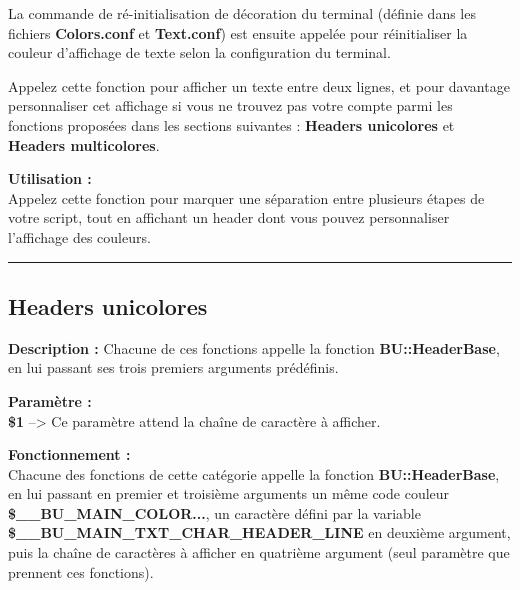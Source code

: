 \documentclass[a4paper,10pt]{article}
\begin{document}
\begin{justify}
    La commande de ré-initialisation de décoration du terminal (définie dans les fichiers \textbf{\color{lime}Colors.conf} et \textbf{\color{lime}Text.conf}) est ensuite appelée pour réinitialiser la couleur d'affichage de texte selon la configuration du terminal.
\end{justify}

\begin{justify}
    Appelez cette fonction pour afficher un texte entre deux lignes, et pour davantage personnaliser cet affichage si vous ne trouvez pas votre compte parmi les fonctions proposées dans les sections suivantes : \textbf{\color{green}Headers unicolores} et \textbf{\color{green}Headers multicolores}.
\end{justify}

\begin{justify}
    \textbf{Utilisation :}\\
    Appelez cette fonction pour marquer une séparation entre plusieurs étapes de votre script, tout en affichant un header dont vous pouvez personnaliser l'affichage des couleurs.
\end{justify}




\color{green}\par\noindent\rule{\textwidth}{0.4pt}\color{white}

\color{green}
\subsection{Headers unicolores}\color{white}

\begin{justify}
    \textbf{Description :}
    Chacune de ces fonctions appelle la fonction \textbf{\color{mauve}BU::HeaderBase}, en lui passant ses trois premiers arguments prédéfinis.
\end{justify}

\begin{justify}
    \textbf{Paramètre :}\\
    \textbf{\color{orange}\$1} --> Ce paramètre attend la chaîne de caractère à afficher.
\end{justify}

\begin{justify}
    \textbf{Fonctionnement :}\\
    Chacune des fonctions de cette catégorie appelle la fonction \textbf{\color{mauve}BU::HeaderBase}, en lui passant en premier et troisième arguments un même code couleur \textbf{\color{orange}\$\_\_BU\_MAIN\_COLOR...}, un caractère défini par la variable \textbf{\color{orange}\$\_\_BU\_MAIN\_TXT\_CHAR\_HEADER\_LINE} en deuxième argument, puis la chaîne de caractères à afficher en quatrième argument (seul paramètre que prennent ces fonctions).
\end{justify}
\end{document}
